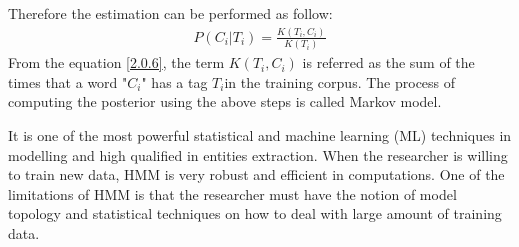 Therefore the estimation can be performed as follow:
\begin{align}
P(C_{i}|T_{i}) =  \frac{K(T_{i},C_{i})}{K(T_{i})} \label{2.0.6}
\end{align}
From the equation \eqref{2.0.6}, the term $K(T_{i},C_{i})$  is referred as the sum of the times that a word "$C_{i}$" has a tag $T_{i}$in the training corpus.
The process of computing the posterior using the above steps is called Markov model.


It is one of the most powerful statistical and machine learning (ML) techniques in modelling and high qualified in entities extraction. When the researcher is willing to train new data, HMM is very robust and efficient in computations.
One of the limitations of HMM is that the researcher must have the notion of model topology and statistical techniques on how to deal with large amount of training data.

